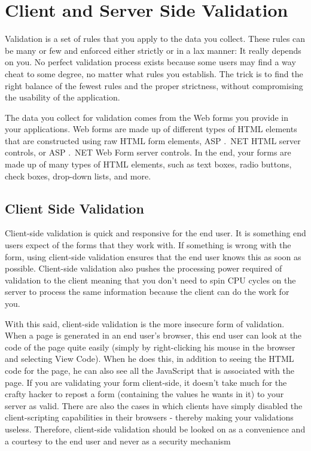 \section{Client and Server Side Validation}
Validation is a set of rules that you apply to the data you collect.
These rules can be many or few and enforced either strictly or in a lax manner: It really depends
on you. No perfect validation process exists because some users may find a way cheat to some
degree, no matter what rules you establish. The trick is to find the right balance of the fewest rules
and the proper strictness, without compromising the usability of the application. 

The data you collect for validation comes from the Web forms you provide in your applications.
Web forms are made up of different types of HTML elements that are constructed using raw
HTML form elements, ASP .\ NET HTML server controls, or ASP .\ NET Web Form server controls. In the end, your forms are made up of many types of HTML elements, such as text boxes, radio
buttons, check boxes, drop-down lists, and more.

\subsection{Client Side Validation}
Client-side validation is quick and responsive for the end user. It is something end users expect of the
forms that they work with. If something is wrong with the form, using client-side validation ensures that
the end user knows this as soon as possible. Client-side validation also pushes the processing power
required of validation to the client meaning that you don’t need to spin CPU cycles on the server to process the same information because the client can do the work for you.

With this said, client-side validation is the more insecure form of validation. When a page is generated in
an end user’s browser, this end user can look at the code of the page quite easily (simply by right-clicking
his mouse in the browser and selecting View Code). When he does this, in addition to seeing the HTML
code for the page, he can also see all the JavaScript that is associated with the page. If you are validating
your form client-side, it doesn’t take much for the crafty hacker to repost a form (containing the values he wants in it) to your server as valid. There are also the cases in which clients have simply disabled the
client-scripting capabilities in their browsers - thereby making your validations useless. Therefore,
client-side validation should be looked on as a convenience and a courtesy to the end user and never as
a security mechanism


